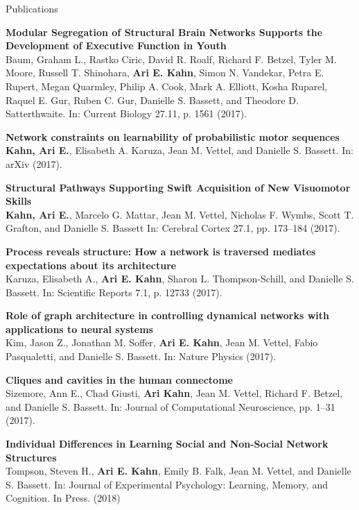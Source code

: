 \documentclass{resume} %
\begin{document}
\begin{rSection}{Publications}


\textbf{Modular Segregation of Structural Brain Networks Supports the Development of Executive Function in Youth} \\
Baum, Graham L., Rastko Ciric, David R. Roalf, Richard F. Betzel, Tyler M. Moore, Russell T. Shinohara, \textbf{Ari E. Kahn}, Simon N. Vandekar, Petra E. Rupert, Megan Quarmley, Philip A. Cook, Mark A. Elliott, Kosha Ruparel, Raquel E. Gur, Ruben C. Gur, Danielle S. Bassett, and Theodore D. Satterthwaite. In: Current Biology 27.11, p. 1561 (2017).

\textbf{Network constraints on learnability of probabilistic motor sequences} \\
\textbf{Kahn, Ari E.}, Elisabeth A. Karuza, Jean M. Vettel, and Danielle S. Bassett. In: arXiv (2017).

\textbf{Structural Pathways Supporting Swift Acquisition of New Visuomotor Skills} \\
\textbf{Kahn, Ari E.}, Marcelo G. Mattar, Jean M. Vettel, Nicholas F. Wymbs, Scott T. Grafton, and Danielle S. Bassett In: Cerebral Cortex 27.1, pp. 173–184 (2017).

\textbf{Process reveals structure: How a network is traversed mediates expectations about its architecture} \\
Karuza, Elisabeth A., \textbf{Ari E. Kahn}, Sharon L. Thompson-Schill, and Danielle S. Bassett. In: Scientific Reports 7.1, p. 12733 (2017).

\textbf{Role of graph architecture in controlling dynamical networks with applications to neural systems} \\
Kim, Jason Z., Jonathan M. Soffer, \textbf{Ari E. Kahn}, Jean M. Vettel, Fabio Pasqualetti, and Danielle S. Bassett. In: Nature Physics (2017).

\textbf{Cliques and cavities in the human connectome} \\
Sizemore, Ann E., Chad Giusti, \textbf{Ari Kahn}, Jean M. Vettel, Richard F. Betzel, and Danielle S. Bassett. In: Journal of Computational Neuroscience, pp. 1–31 (2017).

\textbf{Individual Differences in Learning Social and Non-Social Network Structures} \\
    Tompson, Steven H., \textbf{Ari E. Kahn}, Emily B. Falk, Jean M. Vettel, and Danielle S. Bassett. In: Journal of Experimental Psychology: Learning, Memory, and Cognition. In Press. (2018)


\end{rSection}
\end{document}
